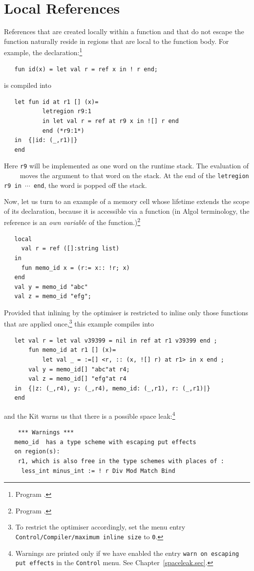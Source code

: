 \documentclass[12pt]{book}
\begin{document}
\section{Local References}
References  that are created locally within a
function and that do not escape the function naturally reside in
regions that are local to the function body.  For example, the
declaration:\footnote{Program .}
\begin{verbatim}
   fun id(x) = let val r = ref x in ! r end;
\end{verbatim}
is compiled into
\begin{verbatim}
   let fun id at r1 [] (x)= 
           letregion r9:1 
           in let val r = ref at r9 x in ![] r end  
           end (*r9:1*)
   in  {|id: (_,r1)|}
   end 
\end{verbatim}
Here {\tt r9} will be implemented as one word on the runtime stack.
The evaluation of ~~~~ moves the argument 
to that word on the stack. At the end of the {\tt letregion r9 in
  $\cdots$ end}, the word is popped off the stack.

Now, let us turn to an example of a memory cell whose lifetime extends
the scope of its declaration, because it is accessible via a function
(in Algol terminology, the reference is an {\em own variable}
%
of the function.)\footnote{Program .}
\begin{verbatim}
   local
     val r = ref ([]:string list)
   in
     fun memo_id x = (r:= x:: !r; x)
   end
   val y = memo_id "abc"
   val z = memo_id "efg";
\end{verbatim}
Provided that inlining by the optimiser is restricted to inline only
those functions that are applied once,\footnote{To restrict the
  optimiser accordingly, set the menu entry {\tt Control/Compiler/maximum
    inline size} to {\tt 0}.} this example compiles into
\begin{verbatim}
   let val r = let val v39399 = nil in ref at r1 v39399 end ; 
       fun memo_id at r1 [] (x)= 
           let val _ = :=[] <r, :: (x, ![] r) at r1> in x end ; 
       val y = memo_id[] "abc"at r4; 
       val z = memo_id[] "efg"at r4
   in  {|z: (_,r4), y: (_,r4), memo_id: (_,r1), r: (_,r1)|}
   end 
\end{verbatim}
and the Kit warns us that there is a possible space
leak:\footnote{Warnings are printed only if we have enabled the entry
  {\tt warn on escaping put effects} in the {\tt Control} menu. See
  Chapter~\ref{spaceleak.sec}.}
\begin{verbatim}
    *** Warnings ***
   memo_id  has a type scheme with escaping put effects 
   on region(s): 
    r1, which is also free in the type schemes with places of :  
     less_int minus_int := ! r Div Mod Match Bind
\end{verbatim}
\end{document}

